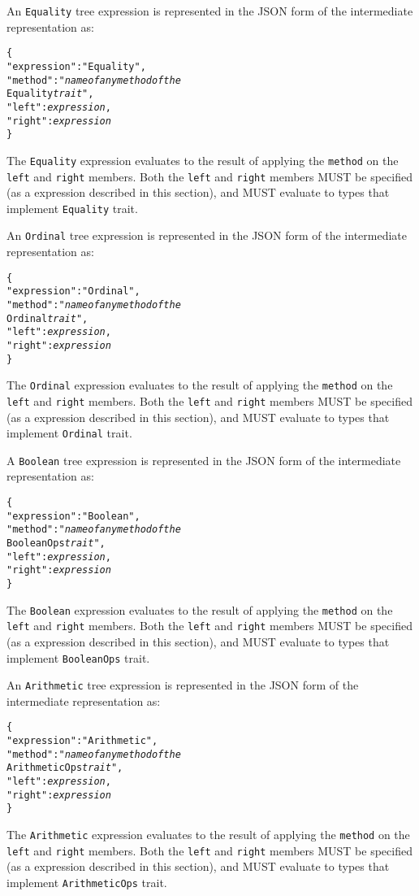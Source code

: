 \documentclass[10pt,twocolumn,a4paper]{article}
\newcommand{\code}[1]{\texttt{#1}}
\begin{document}
An \code{Equality} tree expression is represented in the JSON form of the
intermediate representation as:
\footnotesize
\begin{alltt}
  \{
    "expression"   : "Equality",
    "method"       : "\emph{name of any method of the}
                     Equality \emph{trait}",
    "left"         : \emph{expression},
    "right"        : \emph{expression}
  \}
\end{alltt}
\normalsize
The \code{Equality} expression evaluates to the result of applying the \code{method} on
the \code{left} and \code{right} members.
Both the \code{left} and \code{right} members MUST be specified (as a expression described
in this section), and MUST evaluate to types that implement \code{Equality} trait.

An \code{Ordinal} tree expression is represented in the JSON form of the
intermediate representation as:
\footnotesize
\begin{alltt}
  \{
    "expression"   : "Ordinal",
    "method"       : "\emph{name of any method of the}
                     Ordinal \emph{trait}",
    "left"         : \emph{expression},
    "right"        : \emph{expression}
  \}
\end{alltt}
\normalsize
The \code{Ordinal} expression evaluates to the result of applying the \code{method} on
the \code{left} and \code{right} members.
Both the \code{left} and \code{right} members MUST be specified (as a expression described
in this section), and MUST evaluate to types that implement \code{Ordinal} trait.

A \code{Boolean} tree expression is represented in the JSON form of the
intermediate representation as:
\footnotesize
\begin{alltt}
  \{
    "expression"   : "Boolean",
    "method"       : "\emph{name of any method of the}
                     BooleanOps \emph{trait}",
    "left"         : \emph{expression},
    "right"        : \emph{expression}
  \}
\end{alltt}
\normalsize
The \code{Boolean} expression evaluates to the result of applying the \code{method} on
the \code{left} and \code{right} members.
Both the \code{left} and \code{right} members MUST be specified (as a expression described
in this section), and MUST evaluate to types that implement \code{BooleanOps} trait.

An \code{Arithmetic} tree expression is represented in the JSON form of the
intermediate representation as:
\footnotesize
\begin{alltt}
  \{
    "expression"   : "Arithmetic",
    "method"       : "\emph{name of any method of the}
                     ArithmeticOps \emph{trait}",
    "left"         : \emph{expression},
    "right"        : \emph{expression}
  \}
\end{alltt}
\normalsize
The \code{Arithmetic} expression evaluates to the result of applying the \code{method} on
the \code{left} and \code{right} members.
Both the \code{left} and \code{right} members MUST be specified (as a expression described
in this section), and MUST evaluate to types that implement \code{ArithmeticOps} trait.
\end{document}
